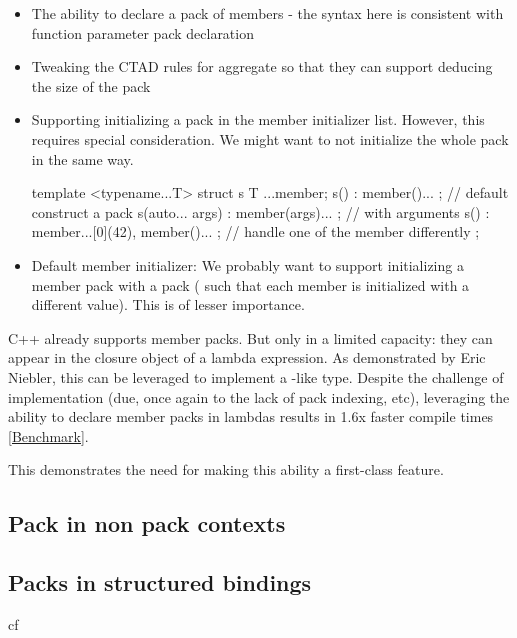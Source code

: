 \documentclass{wg21}
\begin{document}
\begin{itemize}
\item The ability to declare a pack of members - the syntax here is consistent with function parameter pack declaration
\item Tweaking the CTAD rules for aggregate so that they can support deducing the size of the pack
\item Supporting initializing a pack in the member initializer list. However, this requires special consideration. We might want to not initialize the whole pack in the same way.

\begin{colorblock}
template <typename...T>
struct s {
     T ...member;
     s() : member()... {}; // default construct a pack
     s(auto... args) : member(args)... {}; // with arguments
     s() : member...[0](42), member()... {}; // handle one of the member differently
};
\end{colorblock}

\item Default member initializer: We probably want to support initializing a member pack with a pack ( such that each member is initialized with a different value). This is of lesser importance.

\end{itemize}

C++ already supports member packs. But only in a limited capacity: they can appear in
the closure object of a lambda expression.
As demonstrated by Eric Niebler, this can be leveraged to implement a -like type.
Despite the challenge of implementation (due, once again to the lack of pack indexing, etc),
leveraging the ability to declare member packs in lambdas results in 1.6x faster compile times
\href{https://build-bench.com/b/xRgaBoiALe2hMmdYtiJnGCfePIA}{[Benchmark]}.

This demonstrates the need for making this ability a first-class feature.

\subsection{Pack in non pack contexts}


\subsection{Packs in structured bindings}

cf 
\end{document}
